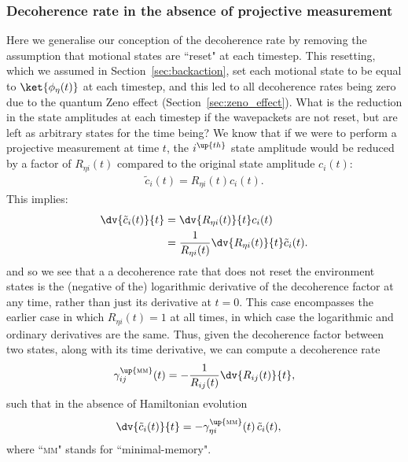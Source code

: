 \subsubsection{Decoherence rate in the absence of projective measurement}

Here we generalise our conception of the decoherence rate by removing the assumption that motional states are ``reset" at each timestep. This resetting, which we assumed in Section~\ref{sec:backaction}, set each motional state to be equal to $\ket{\phi_\eta(t)}$ at each timestep, and this led to all decoherence rates being zero due to the quantum Zeno effect (Section~\ref{sec:zeno_effect}). What is the reduction in the state amplitudes at each timestep if the wavepackets are not reset, but are left as arbitrary states for the time being? We know that if we were to perform a projective measurement at time $t$, the $i^\up{th}$ state amplitude would be reduced by a factor of $R_{\eta i}(t)$ compared to the original state amplitude $c_i(t)$:
\begin{align}
\tilde c_i(t) = R_{\eta i}(t) c_i(t).
\end{align}
This implies:
\begin{align}
\dv{\tilde c_i(t)}{t} &= \dv{R_{\eta i}(t)}{t} c_i(t)\\
&= \frac1{R_{\eta i}(t)}\dv{R_{\eta i}(t)}{t} \tilde c_i(t).
\end{align}
and so we see that a a decoherence rate that does not reset the environment states is the (negative of the) logarithmic derivative of the decoherence factor at any time, rather than just its derivative at $t=0$. This case encompasses the earlier case in which $R_{\eta i}(t) = 1$ at all times, in which case the logarithmic and ordinary derivatives are the same. Thus, given the decoherence factor between two states, along with its time derivative, we can compute a decoherence rate
\begin{align}
\gamma^\up{\textsc{mm}}_{ij}(t) =  -\frac1{R_{ij}(t)}\dv{R_{ij}(t)}{t},
\end{align}
such that in the absence of Hamiltonian evolution
\begin{align}
\dv{\tilde c_i(t)}{t} &= -\gamma^\up{\textsc{mm}}_{\eta i}(t)\,\tilde c_i(t),
\end{align}
where ``\textsc{mm}" stands for ``minimal-memory".

